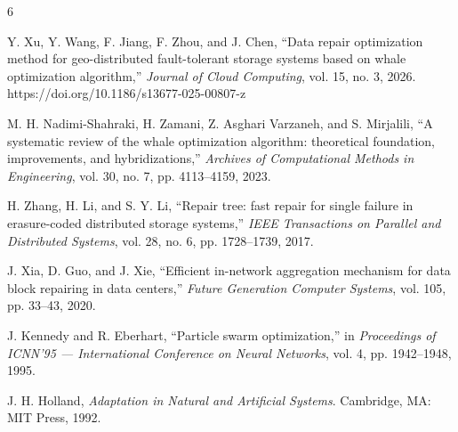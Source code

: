 \documentclass[sigconf]{acmart}
\begin{document}
\begin{thebibliography}{6}

Y. Xu, Y. Wang, F. Jiang, F. Zhou, and J. Chen,
``Data repair optimization method for geo-distributed fault-tolerant storage systems based on whale optimization algorithm,''
\textit{Journal of Cloud Computing}, vol. 15, no. 3, 2026.
https://doi.org/10.1186/s13677-025-00807-z

M. H. Nadimi-Shahraki, H. Zamani, Z. Asghari Varzaneh, and S. Mirjalili,
``A systematic review of the whale optimization algorithm: theoretical foundation, improvements, and hybridizations,''
\textit{Archives of Computational Methods in Engineering}, vol. 30, no. 7, pp. 4113--4159, 2023.

H. Zhang, H. Li, and S. Y. Li,
``Repair tree: fast repair for single failure in erasure-coded distributed storage systems,''
\textit{IEEE Transactions on Parallel and Distributed Systems}, vol. 28, no. 6, pp. 1728--1739, 2017.

J. Xia, D. Guo, and J. Xie,
``Efficient in-network aggregation mechanism for data block repairing in data centers,''
\textit{Future Generation Computer Systems}, vol. 105, pp. 33--43, 2020.

J. Kennedy and R. Eberhart,
``Particle swarm optimization,''
in \textit{Proceedings of ICNN'95 --- International Conference on Neural Networks}, vol. 4, pp. 1942--1948, 1995.

J. H. Holland,
\textit{Adaptation in Natural and Artificial Systems}.
Cambridge, MA: MIT Press, 1992.

\end{thebibliography}
\end{document}
